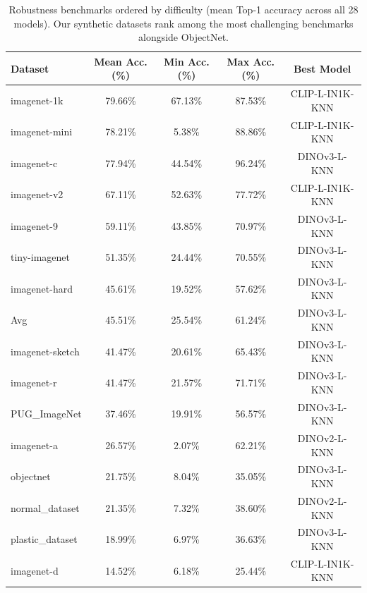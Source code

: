 \begin{table}[h]
\centering
\small
\begin{tabular}{lcccc}
\toprule
\textbf{Dataset} & \textbf{Mean Acc. (\%)} & \textbf{Min Acc. (\%)} & \textbf{Max Acc. (\%)} & \textbf{Best Model} \\
\midrule
imagenet-1k & 79.66\% & 67.13\% & 87.53\% & CLIP-L-IN1K-KNN \\
imagenet-mini & 78.21\% & 5.38\% & 88.86\% & CLIP-L-IN1K-KNN \\
imagenet-c & 77.94\% & 44.54\% & 96.24\% & DINOv3-L-KNN \\
imagenet-v2 & 67.11\% & 52.63\% & 77.72\% & CLIP-L-IN1K-KNN \\
imagenet-9 & 59.11\% & 43.85\% & 70.97\% & DINOv3-L-KNN \\
tiny-imagenet & 51.35\% & 24.44\% & 70.55\% & DINOv3-L-KNN \\
imagenet-hard & 45.61\% & 19.52\% & 57.62\% & DINOv3-L-KNN \\
Avg & 45.51\% & 25.54\% & 61.24\% & DINOv3-L-KNN \\
imagenet-sketch & 41.47\% & 20.61\% & 65.43\% & DINOv3-L-KNN \\
imagenet-r & 41.47\% & 21.57\% & 71.71\% & DINOv3-L-KNN \\
PUG\_ImageNet & 37.46\% & 19.91\% & 56.57\% & DINOv3-L-KNN \\
imagenet-a & 26.57\% & 2.07\% & 62.21\% & DINOv2-L-KNN \\
objectnet & 21.75\% & 8.04\% & 35.05\% & DINOv3-L-KNN \\
normal\_dataset & 21.35\% & 7.32\% & 38.60\% & DINOv2-L-KNN \\
plastic\_dataset & 18.99\% & 6.97\% & 36.63\% & DINOv3-L-KNN \\
imagenet-d & 14.52\% & 6.18\% & 25.44\% & CLIP-L-IN1K-KNN \\
\bottomrule
\end{tabular}
\caption{Robustness benchmarks ordered by difficulty (mean Top-1 accuracy across all 28 models). Our synthetic datasets rank among the most challenging benchmarks alongside ObjectNet.}
\label{tab:dataset_difficulty_spectrum}
\end{table}
